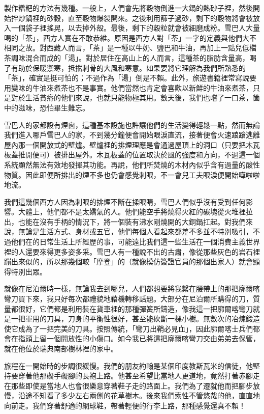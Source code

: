 製作糌粑的方法有幾種。一般上，人們會先將穀物倒進一大鍋的熱砂子裡，然後開始拌炒鍋裡的砂穀，直至穀物爆裂開來。之後利用篩子過砂，剩下的穀物將會被放入一個袋子裡搖晃，以去掉外殼。最後，剩下的穀粒就會被細磨成粉。雪巴人大量喝的「茶」，西方人實在不敢恭維。原因是西方人對「茶」一字的定義與他們大不相同之故。對西藏人而言，「茶」是一種以牛奶、鹽巴和牛油，再加上一點兒低檔茶調味混合而成的「湯」。對於居住在高山上的人而言，這種茶的脂肪含量高，喝了有助於保暖禦寒，抵擋刺骨的大風和寒意。如果要將它理解為我們所熟悉的「茶」，確實是挺可怕的；不過作為「湯」倒是不賴。此外，旅遊書籍裡常寫說要用變味的牛油來煮茶也不是事實。他們當然也肯定會喜歡以新鮮的牛油來煮茶，只是對於生活貧瘠的他們來說，也就只能物極其用。數天後，我們也嚐了一口茶，箇中的滋味，恐怕畢生難忘。

雪巴人的家都設有煙囪，這種基本設施也許讓他們的生活變得輕鬆一點，然而無論我們進入哪戶雪巴人的家，不到幾分鐘便會開始眼淚直流，接著便會火速踉蹌逃離屋內那一個開放式的壁爐。壁爐裡的排煙理應是會通過屋頂上的洞口（只要把木瓦板蓋推開便可）被排出屋外。木瓦板蓋的位置取決於風的強度和方向，不過這一個系統顯然無法有效地發揮其功能。再說，他們所焚燒的木材內似乎含有過量的酸性物質。因此即便所排出的煙不多也仍會感覺刺眼，不一會兒工夫眼淚便開始嘩啦啦地流。

我們這幾個西方人因為刺眼的排煙不斷在揉眼睛，雪巴人們似乎沒有受到任何影響。大體上，他們都不是太嬌氣的人。他們能空手將燒得火紅的碳塊從火堆裡拉出，也能在沒有手柄的情況下，將一個裝有沸水剛燒開的大銅鍋扛起。對我們來說，無論是生活方式、身材或五官，他們每個人看起來都差不多並不特別吸引，不過他們在的日常生活上所經歷的事，可能遠比我們這一些生活在一個消費主義世界裡的人還要來得更多姿多采。雪巴人有一種說不出的古肅，像從那些灰色的岩石裡蹦出來似的，所以那幾個較「摩登」的（就像模仿簽證官員的那個出家人）就會顯得特別出眾。

就像在尼泊爾時一樣，無論我去到哪兒，人們都想要將我繫在腰帶上的那把廓爾喀彎刀買下來，我只好每次都禮貌地藉機轉移話題。大部分在尼泊爾所購得的刀，質量都很好，它們都是利用裝在貨車裡的那種彈簧所鑄造，像我這一把廓爾喀彎刀就是一把軍用的刀具，刀身的平衡性很好，甚至能砍斷一棵小樹。無數次的冶煉鍛造使它成為了一把完美的刀具。按照傳統，「彎刀出鞘必見血」，因此廓爾喀士兵們都會在指頭上留一個開放性的小傷口。如今我已將這把廓爾喀彎刀交由弟弟去保管，就在他位於瑞典南部樹林裡的家中。

旅程在一開始時的步調很緩慢。我們的朋友約翰是某個印度教斯瓦米的信徒，他堅持要穿著他那礙手礙腳的長袍上路。他甚至希望比當地人更道地，竟然打著赤腳走在那些即使是當地人也會很樂意穿著鞋子走的路面上。我們為了遷就他而把腳步放慢，沿途不知看了多少左右兩側的花草樹木。後來我們索性不管悠哉的他，直直地向前走。我們穿著舒適的網球鞋，帶著輕便的行李上路，那種感覺還真不賴！

